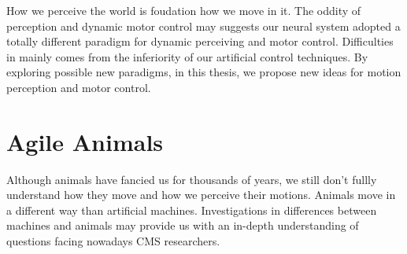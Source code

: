 How we perceive the world is foudation how we move in it.
The oddity of perception and dynamic motor control may suggests our neural system adopted a totally different paradigm for dynamic perceiving and motor control.
Difficulties in \cms mainly comes from the inferiority of our artificial control techniques.
By exploring possible new paradigms, in this thesis, we propose new ideas for motion perception and motor control.

 

\section{Agile Animals}
Although animals have fancied us for thousands of years, we still don't fullly understand how they move and how we perceive their motions.
Animals move in a different way than artificial machines.
Investigations in differences between machines and animals may provide us with an in-depth understanding of questions facing nowadays CMS researchers.

